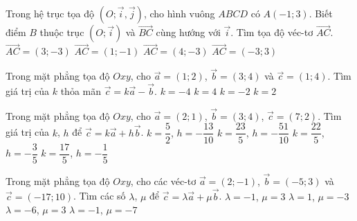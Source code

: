 \begin{ex}%
	Trong hệ trục tọa độ $(O; \vec{i}, \vec{j})$, cho hình vuông $ABCD$ có $A(-1;3)$. Biết điểm $B$ thuộc trục $(O; \vec{i})$ và $\vec{BC}$ cùng hướng với $\vec{i}$. Tìm tọa độ véc-tơ $\vec{AC}$.
	\choice
	{\True $\vec{AC}=(3;-3)$}
	{$\vec{AC}=(1;-1)$}
	{$\vec{AC}=(4;-3)$}
	{$\vec{AC}=(-3;3)$}
\end{ex}
\begin{ex}%
	Trong mặt phẳng tọa độ $Oxy$, cho $\vec{a}=(1;2)$, $\vec{b}=(3;4)$ và $\vec{c}=(1;4)$. Tìm giá trị của $k$ thỏa mãn $\vec{c}=k\vec{a}-\vec{b}$.
	\choice
	{$k=-4$}
	{\True $k=4$}
	{$k=-2$}
	{$k=2$}
\end{ex}
\begin{ex}%
	Trong mặt phẳng tọa độ $Oxy$, cho $\vec{a}=(2;1)$, $\vec{b}=(3;4)$, $\vec{c}=(7;2)$. Tìm giá trị của $k$, $h$ để $\vec{c}=k\vec{a}+h\vec{b}$.
	\choice
	{$k=\dfrac{5}{2}$, $h=-\dfrac{13}{10}$}
	{$k=\dfrac{23}{5}$, $h=-\dfrac{51}{10}$}
	{\True $k=\dfrac{22}{5}$, $h=-\dfrac{3}{5}$}
	{$k=\dfrac{17}{5}$, $h=-\dfrac{1}{5}$}
\end{ex}
\begin{ex}%
	Trong mặt phẳng tọa độ $Oxy$, cho các véc-tơ $\vec{a}=(2;-1)$, $\vec{b}=(-5;3)$ và $\vec{c}=(-17;10)$. Tìm các số $\lambda$, $\mu$ để $\vec{c}=\lambda\vec{a}+\mu\vec{b}$.
	\choice
	{\True $\lambda=-1$, $\mu=3$}
	{$\lambda=1$, $\mu=-3$}
	{$\lambda=-6$, $\mu=3$}
	{$\lambda=-1$, $\mu=-7$}
\end{ex}
